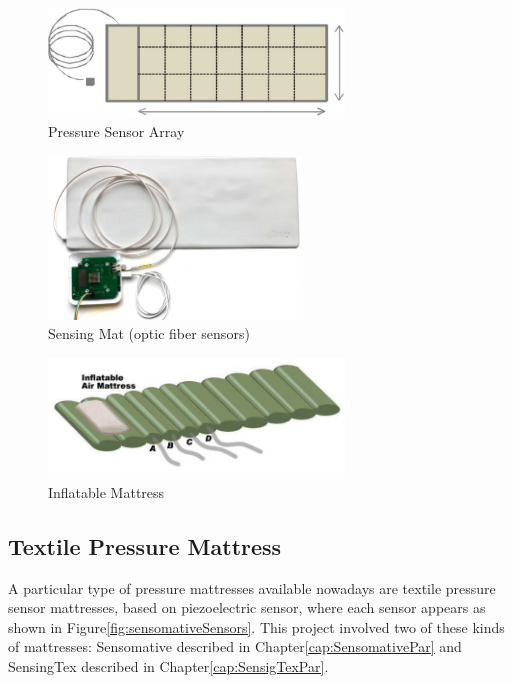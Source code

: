 \begin{figure}[h]
    \centering
    \includegraphics[width=0.7\textwidth]{img/pressure_array.pdf}
    \caption{Pressure Sensor Array}
    \label{fig:sensorArray}
    
\end{figure}
\begin{figure}[h]
   \centering
    \includegraphics[width=0.6\textwidth]{img/sadek_fig.pdf}
    \caption{Sensing Mat (optic fiber sensors)}
    \label{fig:sadek}
\end{figure}
\begin{figure}[h]
    \centering
     \includegraphics[width=0.7\textwidth]{img/arimat.pdf}
     \caption{Inflatable Mattress}
     \label{fig:airmat}
 \end{figure}


\subsection{Textile Pressure Mattress} \label{cap:textile}
A particular type of pressure mattresses available nowadays are textile pressure sensor mattresses, based on piezoelectric sensor, where each sensor appears as shown in Figure\ref{fig:sensomativeSensors}. This project involved two of these kinds of mattresses: Sensomative\cite{sensomativeUrl} described in Chapter\ref{cap:SensomativePar} and SensingTex\cite{SensingConnectivity} described in Chapter\ref{cap:SensigTexPar}.

